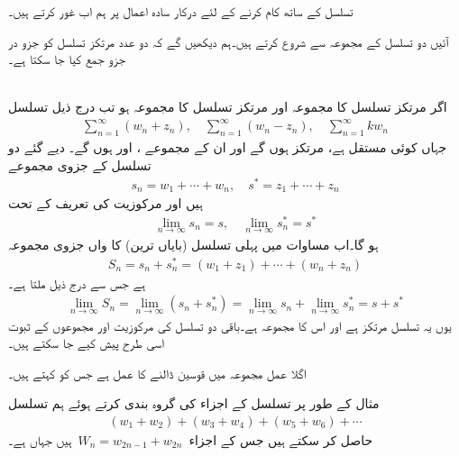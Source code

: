 تسلسل کے ساتھ کام کرنے کے لئے درکار سادہ اعمال پر ہم اب غور کرتے ہیں۔

آئیں دو تسلسل کے مجموعہ سے شروع کرتے ہیں۔ہم دیکھیں گے کہ دو عدد مرتکز تسلسل کو جزو در جزو جمع کیا جا سکتا ہے۔

\quad{}\quad {}\\
اگر مرتکز تسلسل  کا مجموعہ  اور مرتکز تسلسل  کا مجموعہ  ہو تب درج ذیل تسلسل
\begin{align}\label{مساوات_ترتیب_اعمال_الف}
\sum\limits_{n=1}^{\infty} (w_n+z_n), \quad \sum\limits_{n=1}^{\infty} (w_n-z_n), \quad \sum\limits_{n=1}^{\infty} kw_n
\end{align}
جہاں  کوئی مستقل ہے، مرتکز ہوں گے اور ان کے مجموعے ،  اور  ہوں گے۔ 
\quad
دیے گئے دو تسلسل کے جزوی مجموعے
\begin{align*}
s_n=w_1+\cdots+w_n,\quad s^*=z_1+\cdots+z_n
\end{align*}
ہیں اور مرکوزیت کی تعریف کے تحت
\begin{align*}
\lim_{n\to \infty} s_n=s,\quad \lim_{n\to \infty} s^*_n=s^*
\end{align*}
ہو گا۔اب مساوات  میں   پہلی تسلسل (بایاں ترین) کا  واں جزوی مجموعہ 
\begin{align*}
S_n=s_n+s^*_n=(w_1+z_1)+\cdots+(w_n+z_n)
\end{align*}
ہے جس سے درج ذیل ملتا ہے۔
\begin{align*}
\lim_{n\to\infty}S_n=\lim_{n\to \infty} (s_n+s^*_n)=\lim_{n\to\infty} s_n+\lim_{n\to\infty} s^*_n=s+s^*
\end{align*}
یوں یہ تسلسل مرتکز ہے اور اس کا مجموعہ  ہے۔باقی دو تسلسل کی مرکوزیت اور مجموعوں کے ثبوت اسی طرح پیش کیے جا سکتے ہیں۔

اگلا عمل مجموعہ میں قوسین ڈالنے کا عمل ہے جس کو  کہتے ہیں۔ 

مثال کے طور پر تسلسل  کے اجزاء کی گروہ بندی کرتے ہوئے ہم تسلسل
\begin{align*}
(w_1+w_2)+(w_3+w_4)+(w_5+w_6)+\cdots
\end{align*}
حاصل کر سکتے ہیں جس کے اجزاء 
$\,W_n=w_{2n-1}+w_{2n}\,$
ہیں جہاں  ہے۔

